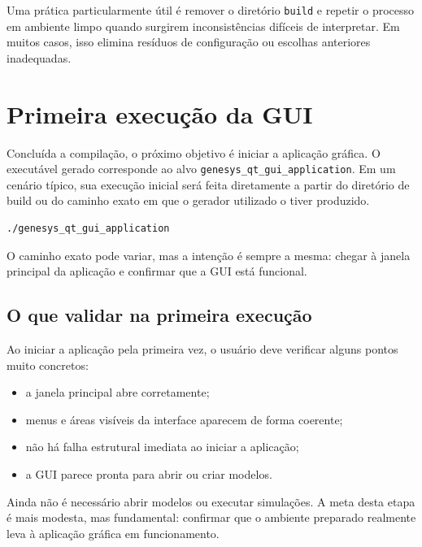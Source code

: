 Uma prática particularmente útil é remover o diretório \texttt{build} e repetir o processo em ambiente limpo quando surgirem inconsistências difíceis de interpretar. Em muitos casos, isso elimina resíduos de configuração ou escolhas anteriores inadequadas.

\section{Primeira execução da GUI}
\label{sec:cap2_primeira_execucao_gui}

Concluída a compilação, o próximo objetivo é iniciar a aplicação gráfica. O executável gerado corresponde ao alvo \texttt{genesys\_qt\_gui\_application}. Em um cenário típico, sua execução inicial será feita diretamente a partir do diretório de build ou do caminho exato em que o gerador utilizado o tiver produzido.

\begin{lstlisting}[language=bash,caption={Exemplo genérico de primeira execução da GUI},label={lst:cap2_primeira_execucao_gui}]
    ./genesys_qt_gui_application
\end{lstlisting}

O caminho exato pode variar, mas a intenção é sempre a mesma: chegar à janela principal da aplicação e confirmar que a GUI está funcional.

\subsection{O que validar na primeira execução}
\label{subsec:cap2_o_que_validar_primeira_execucao}

Ao iniciar a aplicação pela primeira vez, o usuário deve verificar alguns pontos muito concretos:

\begin{itemize}
    \item a janela principal abre corretamente;
    \item menus e áreas visíveis da interface aparecem de forma coerente;
    \item não há falha estrutural imediata ao iniciar a aplicação;
    \item a GUI parece pronta para abrir ou criar modelos.
\end{itemize}

Ainda não é necessário abrir modelos ou executar simulações. A meta desta etapa é mais modesta, mas fundamental: confirmar que o ambiente preparado realmente leva à aplicação gráfica em funcionamento.

